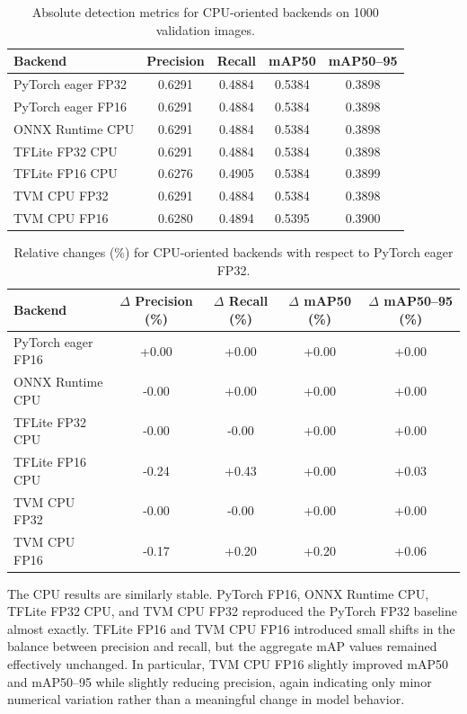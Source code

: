 \documentclass[12pt,a4paper]{report}
\begin{document}
\begin{table}[ht]
\centering
\caption{Absolute detection metrics for CPU-oriented backends on 1000 validation images.}
\label{tab:acc_abs_cpu_backends}
\begin{tabular}{lcccc}
\toprule
Backend & Precision & Recall & mAP50 & mAP50--95 \\
\midrule
PyTorch eager FP32  & 0.6291 & 0.4884 & 0.5384 & 0.3898 \\
PyTorch eager FP16  & 0.6291 & 0.4884 & 0.5384 & 0.3898 \\
ONNX Runtime CPU    & 0.6291 & 0.4884 & 0.5384 & 0.3898 \\
TFLite FP32 CPU     & 0.6291 & 0.4884 & 0.5384 & 0.3898 \\
TFLite FP16 CPU     & 0.6276 & 0.4905 & 0.5384 & 0.3899 \\
TVM CPU FP32        & 0.6291 & 0.4884 & 0.5384 & 0.3898 \\
TVM CPU FP16        & 0.6280 & 0.4894 & 0.5395 & 0.3900 \\
\bottomrule
\end{tabular}
\end{table}

\begin{table}[ht]
\centering
\caption{Relative changes (\%) for CPU-oriented backends with respect to PyTorch eager FP32.}
\label{tab:acc_rel_cpu_backends}
\begin{tabular}{lcccc}
\toprule
Backend & $\Delta$ Precision (\%) & $\Delta$ Recall (\%) & $\Delta$ mAP50 (\%) & $\Delta$ mAP50--95 (\%) \\
\midrule
PyTorch eager FP16 & +0.00 & +0.00 & +0.00 & +0.00 \\
ONNX Runtime CPU   & -0.00 & +0.00 & +0.00 & +0.00 \\
TFLite FP32 CPU    & -0.00 & -0.00 & +0.00 & +0.00 \\
TFLite FP16 CPU    & -0.24 & +0.43 & +0.00 & +0.03 \\
TVM CPU FP32       & -0.00 & -0.00 & +0.00 & +0.00 \\
TVM CPU FP16       & -0.17 & +0.20 & +0.20 & +0.06 \\
\bottomrule
\end{tabular}
\end{table}

The CPU results are similarly stable. PyTorch FP16, ONNX Runtime CPU, TFLite FP32 CPU, and TVM CPU FP32 reproduced
the PyTorch FP32 baseline almost exactly. TFLite FP16 and TVM CPU FP16 introduced small shifts in the balance
between precision and recall, but the aggregate mAP values remained effectively unchanged. In particular,
TVM CPU FP16 slightly improved mAP50 and mAP50--95 while slightly reducing precision, again indicating only minor
numerical variation rather than a meaningful change in model behavior.
\end{document}
